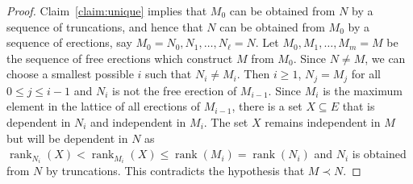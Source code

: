 \documentclass{daj}
\newtheorem{lemma}[thm]{Lemma}\theoremstyle{plain}
\newtheorem{claim}[thm]{Claim}\theoremstyle{plain}
\DeclareMathOperator{\rank}{rank}
\begin{document}
\begin{proof}

Claim~\ref{claim:unique} implies that $M_0$ can be obtained from $N$ by a sequence of truncations, and hence that %
$N$ can be obtained from $M_0$ by a sequence of erections, say
$M_0=N_0, N_1, \dots, N_{\ell}=N$. Let $M_0, M_1, \dots, M_{m}=M$ be the sequence of free erections which construct $M$ from $M_0$.
Since $N\neq M$,  we can choose a smallest possible $i$ such that $N_{i}\neq M_i$. Then $i\geq 1$, $N_j=M_j$ for all $0\leq j\leq i-1$ and $N_i$ is not the free erection of $M_{i-1}$.
Since  $M_i$ is the maximum element in the  lattice of all erections of $M_{i-1}$,   there is a set $X\subseteq E$ that is dependent in $N_{i}$ and independent in  $M_i$.
The set $X$ remains independent in  $M$ but will be dependent in $N$ as $\rank_{N_i}(X)<\rank_{M_i}(X)\leq \rank(M_i) =\rank(N_i)$ and        
$N_{i}$ is obtained from $N$ by truncations.
This contradicts the hypothesis that $M\prec N$.
\end{proof}
\end{document}
